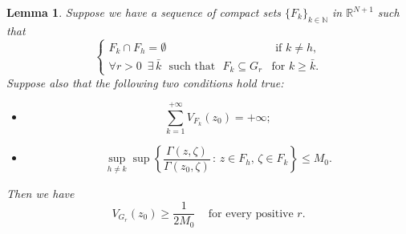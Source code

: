 \documentclass[10pt]{amsart}
\def \N {\mathbb{N}}
\def \RNu {\mathbb{R}^{N+1}}
\newtheorem{lemma}[theorem]{Lemma}
\numberwithin{equation}{section}
\begin{document}
\begin{lemma}\label{per0}
Suppose we have a sequence of compact sets $\{F_k\}_{k\in\N}$ in $\RNu$ such that
$$\begin{cases}
F_k\cap F_h=\emptyset & \text{ if }k\neq h,\\
\forall r>0\,\,\, \exists \,\bar{k} \,\,\mbox{ such that }\,\, F_k\subseteq G_r &  \text{for }k\geq\bar{k}.
\end{cases}$$
Suppose also that the following two conditions hold true:
\begin{itemize}

\item[($i$)]\label{i}$$\sum_{k=1}^{+\infty}{V_{F_k}(z_0)}=+\infty;$$
\item[($ii$)]\label{ii}$$\sup_{h\neq k}\sup{\left\{\frac{\Gamma(z,\zeta)}{\Gamma(z_0,\zeta)}\,:\,z\in F_h,\,\zeta\in F_k\right\}}\leq M_0.$$
\end{itemize}
Then we have
$$V_{G_r}(z_0)\geq \frac{1}{2M_0}\quad\, \mbox{for every positive }r.$$
\end{lemma}
\end{document}
